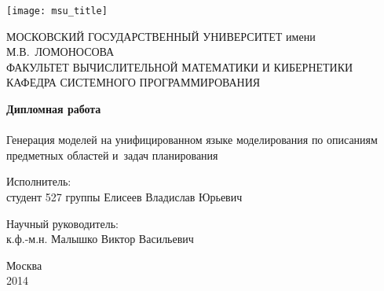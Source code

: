 \begin{titlepage}

\begin{center}

\texttt{[image: msu\_title]}

{\small
МОСКОВСКИЙ ГОСУДАРСТВЕННЫЙ УНИВЕРСИТЕТ имени М.В.~ЛОМОНОСОВА \\
ФАКУЛЬТЕТ ВЫЧИСЛИТЕЛЬНОЙ МАТЕМАТИКИ И КИБЕРНЕТИКИ \\
КАФЕДРА СИСТЕМНОГО ПРОГРАММИРОВАНИЯ
}
\end{center}

\vfill
\vfill
\begin{center}
\Large{\textbf{Дипломная работа}} \\
~\\
\Large{Генерация моделей на унифицированном языке моделирования по описаниям предметных областей и~задач планирования}
\end{center}
\vfill
\vfill
\vfill
\vfill
\begin{flushright}
Исполнитель: \\
студент 527 группы Елисеев Владислав Юрьевич
\end{flushright}
\vfill
\begin{flushright}
Научный руководитель: \\к.ф.-м.н. Малышко Виктор Васильевич
\end{flushright}
  
\vfill
\vfill
\vfill
\vfill
\begin{center}
  Москва\\
  2014
\end{center}  
\end{titlepage}